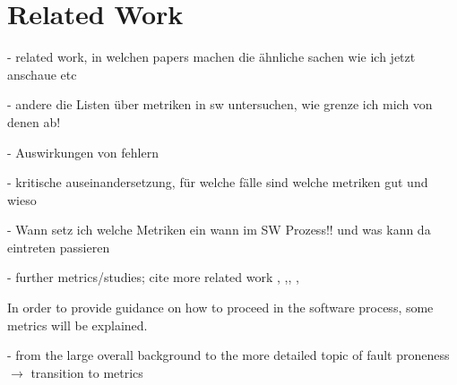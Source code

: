 \section{Related Work}

- related work, in welchen papers machen die ähnliche sachen wie ich jetzt anschaue etc

- andere die Listen über metriken in sw untersuchen, wie grenze ich mich von denen ab!

- Auswirkungen von fehlern

- kritische auseinandersetzung, für welche fälle sind welche metriken gut und wieso

- Wann setz ich welche Metriken ein wann im SW Prozess!! und was kann da eintreten passieren

- further metrics/studies; cite more related work \cite{b10el2001prediction}, \cite{b11basili1996validation},\cite{b12riand2002assessing}, \cite{b14chidamber1994metrics}, \cite{b15chidamber1991towards}

In order to provide guidance on how to proceed in the software process, some metrics will be explained.

- from the large overall background to the more detailed topic of fault proneness $\rightarrow$ transition to metrics